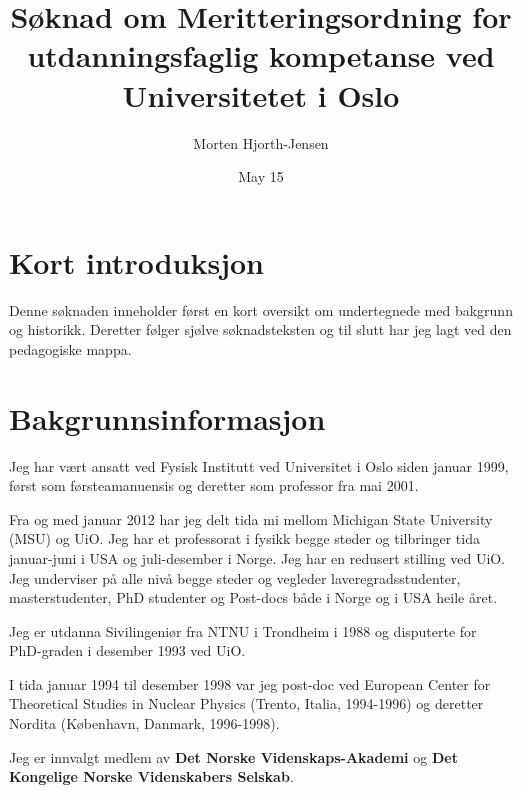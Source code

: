 \documentclass[aps,floatfix,preprint]{revtex4-1}
\begin{document}
\title{Søknad om Meritteringsordning for utdanningsfaglig kompetanse ved Universitetet i Oslo}

\author{Morten Hjorth-Jensen}

\date{May 15}


\maketitle




\section*{Kort introduksjon}

Denne søknaden inneholder først en kort oversikt om undertegnede  med bakgrunn og historikk.
Deretter følger sjølve søknadsteksten og til slutt har jeg lagt ved den pedagogiske mappa. 


\section*{Bakgrunnsinformasjon}

Jeg har vært ansatt ved Fysisk Institutt ved Universitet i Oslo siden
januar 1999, først som førsteamanuensis og deretter som professor fra
mai 2001.

Fra og med januar 2012 har jeg delt tida mi mellom Michigan
State University (MSU) og UiO. Jeg har et professorat i fysikk begge
steder og tilbringer tida januar-juni i USA og juli-desember i
Norge. Jeg har en redusert stilling ved UiO. Jeg underviser på alle
nivå begge steder og vegleder laveregradsstudenter, masterstudenter,
PhD studenter og Post-docs både i Norge og i USA heile året.

Jeg er utdanna Sivilingeniør fra NTNU i Trondheim i 1988 og disputerte
for PhD-graden i desember 1993 ved UiO.

I tida januar 1994 til desember 1998 var jeg post-doc ved European
Center for Theoretical Studies in Nuclear Physics (Trento, Italia,
1994-1996) og deretter Nordita (København, Danmark, 1996-1998).

Jeg er innvalgt medlem av \textbf{Det Norske Videnskaps-Akademi} og \textbf{Det Kongelige Norske Videnskabers Selskab}.
\end{document}
